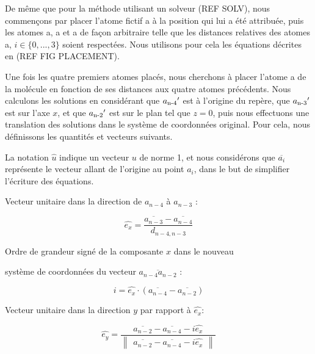 \par De même que pour la méthode utilisant un solveur (REF SOLV), nous commençons par placer l'atome fictif a à la position qui lui a été attribuée, puis les atomes a, a et a de façon arbitraire telle que les distances relatives des atomes a, $i \in \{0, ..., 3\}$ soient respectées. Nous utilisons pour cela les équations décrites en (REF FIG PLACEMENT).\\

\par Une fois les quatre premiers atomes placés, nous cherchons à placer l'atome a de la molécule en fonction de ses distances aux quatre atomes précédents. Nous calculons les solutions en considérant que $a\textsubscript{n-4}'$ est à l'origine du repère, que $a\textsubscript{n-3}'$ est sur l'axe $x$, et que $a\textsubscript{n-2}'$ est sur le plan tel que $z=0$, puis nous effectuons une translation des solutions dans le système de coordonnées original. Pour cela, nous définissons les quantités et vecteurs suivants. 
\par La notation $\hat{u}$ indique un vecteur $u$ de norme 1, et nous considérons que $\overline{a_i}$ représente le vecteur allant de l'origine au point $a_i$, dans le but de simplifier l'écriture des équations.\\

\vspace{0.4cm}

\centerline{Vecteur unitaire dans la direction de $a_{n-4}$ à $a_{n-3}$ :}

\[
\hat{e_x} = \frac{\overline{a_{n-3}}-\overline{a_{n-4}}}{d_{n-4,n-3}}
\]

\vspace{0.4cm}

\centerline{Ordre de grandeur signé de la composante $x$ dans le nouveau}
\centerline{ système de coordonnées du vecteur $\overline{a_{n-4}a_{n-2}}$ : }
\[
i = \hat{e_x}\cdot(\overline{a_{n-4}}-\overline{a_{n-2}})
\]

\vspace{0.4cm}

\centerline{Vecteur unitaire dans la direction $y$ par rapport à $\hat{e_x}$:}
\[
\hat{e_y} = \frac{\overline{a_{n-2}}-\overline{a_{n-4}}-i\hat{e_x}}{\begin{Vmatrix}\overline{a_{n-2}}-\overline{a_{n-4}}-i\hat{e_x}\end{Vmatrix}}
\]

\vspace{0.4cm}

